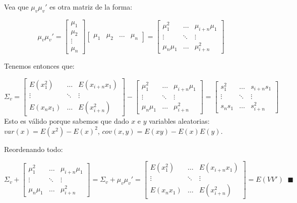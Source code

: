 \documentclass[
]{article}
\begin{document}
Vea que \(\mu_{v}\mu_{v}'\) es otra matriz de la forma:

\[
\mu_{v}\mu_{v}' = \begin{bmatrix}
            \mu_{1} \\ \mu_{2} \\ \vdots \\ \mu_{n}
      \end{bmatrix}
      \begin{bmatrix}
            \mu_{1} & \mu_{2} & \dots & \mu_{n}
      \end{bmatrix} = 
      \begin{bmatrix}
            \mu_{1}^{2} & \dots & \mu_{i + n}\mu_{1} \\
            \vdots    & \ddots & \vdots \\
            \mu_{n}\mu_{1} & \dots & \mu_{i + n}^{2}
      \end{bmatrix}
\]

Tenemos entonces que:

\[
\Sigma_{v} =       
      \begin{bmatrix}
            E(x_{1}^{2}) & \dots & E(x_{i + n}x_{1}) \\
            \vdots    & \ddots & \vdots \\
            E(x_{n}x_{1}) & \dots & E(x_{i + n}^{2})
      \end{bmatrix} - 
      \begin{bmatrix}
            \mu_{1}^{2} & \dots & \mu_{i + n}\mu_{1} \\
            \vdots    & \ddots & \vdots \\
            \mu_{n}\mu_{1} & \dots & \mu_{i + n}^{2}
      \end{bmatrix} 
      = 
      \begin{bmatrix}
            s_{1}^{2} & \dots & s_{i + n}s_{1} \\
            \vdots    & \ddots & \vdots \\
            s_{n}s_{1} & \dots & s_{i + n}^{2}
      \end{bmatrix} 
\] Esto es válido porque sabemos que dado \(x\) e \(y\) variables
aleatorias: \(var(x) = E(x^2) - E(x)^2\),
\(cov(x, y) = E(xy) - E(x)E(y)\).

Reordenando todo:

\[
\Sigma_{v} + 
      \begin{bmatrix}
                  \mu_{1}^{2} & \dots & \mu_{i + n}\mu_{1} \\
                  \vdots    & \ddots & \vdots \\
                  \mu_{n}\mu_{1} & \dots & \mu_{i + n}^{2}
      \end{bmatrix} = \Sigma_{v} +  \mu_{v}\mu_{v}' =      
      \begin{bmatrix}
            E(x_{1}^{2}) & \dots & E(x_{i + n}x_{1}) \\
            \vdots    & \ddots & \vdots \\
            E(x_{n}x_{1}) & \dots & E(x_{i + n}^{2})
      \end{bmatrix} 
      = E(VV') \;\;
      \blacksquare
\]
\end{document}
